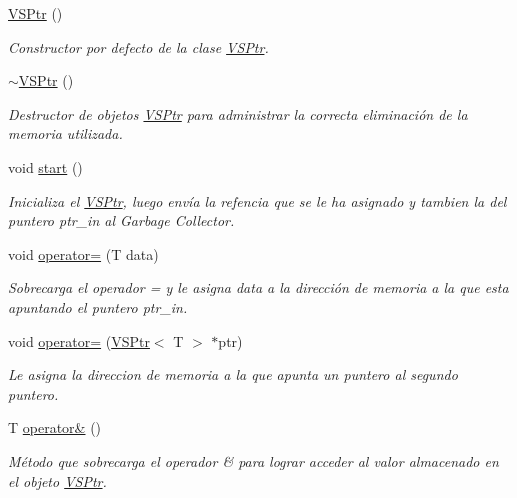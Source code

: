 \begin{DoxyCompactItemize}
\item 
\hyperlink{class_v_s_ptr_a3f9256a7afba8e671e188c87103b4570}{V\+S\+Ptr} ()
\begin{DoxyCompactList}\small\item\em Constructor por defecto de la clase \hyperlink{class_v_s_ptr}{V\+S\+Ptr}. \end{DoxyCompactList}\item 
\hyperlink{class_v_s_ptr_a3868ebe6b47b27b0e1397a75407d08f8}{$\sim$\+V\+S\+Ptr} ()
\begin{DoxyCompactList}\small\item\em Destructor de objetos \hyperlink{class_v_s_ptr}{V\+S\+Ptr} para administrar la correcta eliminación de la memoria utilizada. \end{DoxyCompactList}\item 
void \hyperlink{class_v_s_ptr_aeef7dd00463ef98da0e338dae756b4d5}{start} ()
\begin{DoxyCompactList}\small\item\em Inicializa el \hyperlink{class_v_s_ptr}{V\+S\+Ptr}, luego envía la refencia que se le ha asignado y tambien la del puntero ptr\+\_\+in al Garbage Collector. \end{DoxyCompactList}\item 
void \hyperlink{class_v_s_ptr_ae1cdd73e2116e115149e517b4045b7f9}{operator=} (T data)
\begin{DoxyCompactList}\small\item\em Sobrecarga el operador = y le asigna data a la dirección de memoria a la que esta apuntando el puntero ptr\+\_\+in. \end{DoxyCompactList}\item 
void \hyperlink{class_v_s_ptr_aa27d1b845423f19aa9403bdd56586ab9}{operator=} (\hyperlink{class_v_s_ptr}{V\+S\+Ptr}$<$ T $>$ $\ast$ptr)
\begin{DoxyCompactList}\small\item\em Le asigna la direccion de memoria a la que apunta un puntero al segundo puntero. \end{DoxyCompactList}\item 
T \hyperlink{class_v_s_ptr_a7d3b2ef1c0ef66d6d3f70cfd39549515}{operator\&} ()
\begin{DoxyCompactList}\small\item\em Método que sobrecarga el operador \& para lograr acceder al valor almacenado en el objeto \hyperlink{class_v_s_ptr}{V\+S\+Ptr}. \end{DoxyCompactList}\item 

\end{DoxyCompactItemize}
